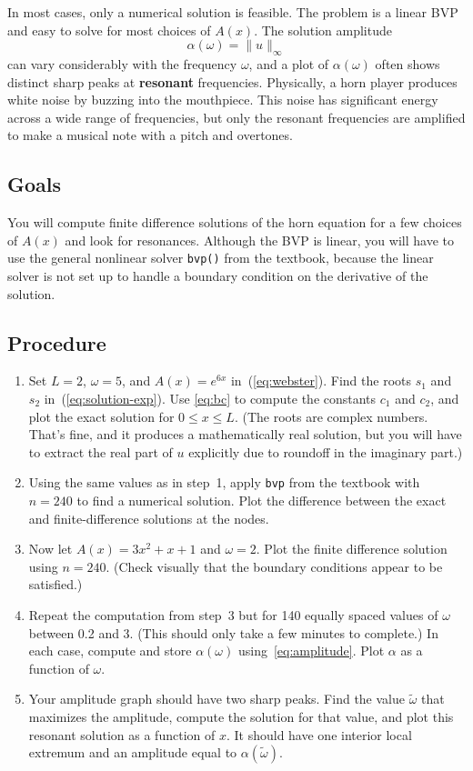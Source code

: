 \documentclass[11pt,twoside]{article}
\begin{document}
In most cases, only a numerical solution is feasible. The problem is a linear BVP and easy to solve for most choices of $A(x)$. The solution amplitude 
\begin{equation}
  \label{eq:amplitude}
  \alpha(\omega)=\|u\|_\infty  
\end{equation}
can vary considerably with the frequency $\omega$, and a plot of $\alpha(\omega)$ often shows distinct sharp peaks at \textbf{resonant} frequencies. Physically, a horn player produces white noise by buzzing into the mouthpiece. This noise has significant energy across a wide range of frequencies, but only the resonant frequencies are amplified to make a musical note with a pitch and overtones. 

\subsection*{Goals}

You will compute finite difference solutions of the horn equation for a few choices of $A(x)$ and look for resonances. Although the BVP is linear, you will have to use the general nonlinear solver \texttt{bvp()} from the textbook, because the linear solver is not set up to handle a boundary condition on the derivative of the solution.

\subsection*{Procedure}

\begin{enumerate}
    \item Set $L=2$, $\omega=5$, and $A(x)=e^{6x}$  in~(\ref{eq:webster}). Find the roots $s_1$ and $s_2$ in~(\ref{eq:solution-exp}). Use \eqref{eq:bc} to compute the constants $c_1$ and $c_2$, and plot the exact solution for $0\le x \le L$. (The roots are complex numbers. That's fine, and it produces a mathematically real solution, but you will have to extract the real part of $u$ explicitly due to roundoff in the imaginary part.) 
    \item Using the same values as in step~1, apply \texttt{bvp} from the textbook with $n=240$ to find a numerical solution. Plot the difference between the exact and finite-difference solutions at the nodes. 
    \item Now let $A(x)=3x^2+x+1$ and $\omega=2$. Plot the finite difference solution using $n=240$. (Check visually that the boundary conditions appear to be satisfied.)
    \item Repeat the computation from step~3 but for 140 equally spaced values of $\omega$ between 0.2 and 3. (This should only take a few minutes to complete.) In each case, compute and store $\alpha(\omega)$ using~\eqref{eq:amplitude}. Plot $\alpha$ as a function of $\omega$.
    \item Your amplitude graph should have two sharp peaks. Find the value $\tilde{\omega}$ that maximizes the amplitude, compute the solution for that value, and plot this resonant solution as a function of $x$. It should have one interior local extremum and an amplitude equal to $\alpha(\tilde{\omega})$.
\end{enumerate}
\end{document}
